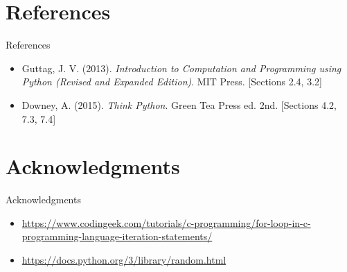 \documentclass[t,handout,9pt]{beamer}
\begin{document}
\section{References}
\begin{frame}{References}
\begin{itemize}
	\item Guttag, J. V. (2013). \textit{Introduction to Computation and Programming using Python (Revised and Expanded Edition)}. MIT Press. [Sections 2.4, 3.2]
	\item Downey, A. (2015). \textit{Think Python}. Green Tea Press ed. 2nd. [Sections 4.2, 7.3, 7.4]
\end{itemize}
\end{frame}
\section{Acknowledgments}
\begin{frame}{Acknowledgments}
\begin{itemize}
	\item \url{https://www.codingeek.com/tutorials/c-programming/for-loop-in-c-programming-language-iteration-statements/}
	\item \url{https://docs.python.org/3/library/random.html}
\end{itemize}
\end{frame}
%

\end{document}

